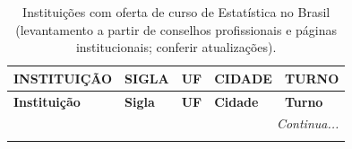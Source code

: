 {\small
\setlength{\tabcolsep}{3pt}
\renewcommand{\arraystretch}{1.05}
\begin{longtable}{p{5.2cm}p{1.2cm}p{0.8cm}p{2.6cm}p{2.6cm}}
\caption{Instituições com oferta de curso de Estatística no Brasil (levantamento a partir de conselhos profissionais e p\'aginas institucionais; conferir atualiza\c{c}\~oes).}\label{tab:cursos-estatistica-brasil}\\
\toprule
\textbf{INSTITUIÇÃO} & \textbf{SIGLA} & \textbf{UF} & \textbf{CIDADE} & \textbf{TURNO}\\
\midrule
\endfirsthead

\toprule
\textbf{Instituição} & \textbf{Sigla} & \textbf{UF} & \textbf{Cidade} & \textbf{Turno}\\
\midrule
\endhead

\midrule
\multicolumn{5}{r}{\textit{Continua...}}\\
\endfoot

\bottomrule
\endlastfoot


\end{longtable}}
